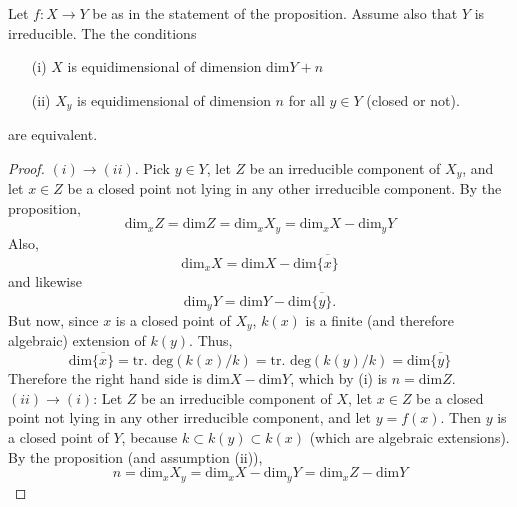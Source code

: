 \begin{corollary} Let $f:X\rightarrow Y$ be as in the statement of
the proposition. Assume also that $Y$ is irreducible. The the
conditions \begin{itemize} \item[(i)] $X$ is equidimensional of
dimension $\text{dim} Y + n$ \item[(ii)] $X_y$ is equidimensional
of dimension  $n$ for all $y \in Y$ (closed or not). \end{itemize}
are equivalent. \end{corollary} \begin{proof} $(i) \rightarrow
(ii)$. Pick $y \in Y$, let $Z$ be an irreducible component of
$X_y$, and let $x \in Z$ be a closed point not lying in any other
irreducible component. By the proposition, \[\text{dim}_x Z =
\text{dim} Z = \text{dim}_x X_y = \text{dim}_x X - \text{dim}_y
Y\] Also, \[ \text{dim}_x X =  \text{dim} X - \text{dim}
\overline{\{x\}} \] and likewise \[ \text{dim}_y Y =  \text{dim} Y
- \text{dim} \overline{\{y\}}. \] But now, since $x$ is a closed
point of $X_y$, $k(x)$ is a finite (and therefore algebraic)
extension of $k(y)$. Thus, \[\text{dim} \overline{\{x\}} =
\text{tr. deg}(k(x)/k) = \text{tr. deg}(k(y)/k) = \text{dim}
\overline{\{y\}}\] Therefore the right hand side is
$\text{dim}X - \text{dim} Y$, which by (i) is $n = \text{dim} Z$.\\

$(ii) \rightarrow (i)$: Let $Z$ be an irreducible component of
$X$, let $x \in Z$ be a closed point not lying in any other
irreducible component, and let $y = f(x)$. Then $y$ is a closed
point of $Y$, because $k \subset k(y) \subset k(x)$ (which are
algebraic extensions). By the proposition (and assumption (ii)),
\[ n = \text{dim}_x X_y = \text{dim}_x X - \text{dim}_y Y =
\text{dim}_x Z - \text{dim} Y \] \end{proof}

